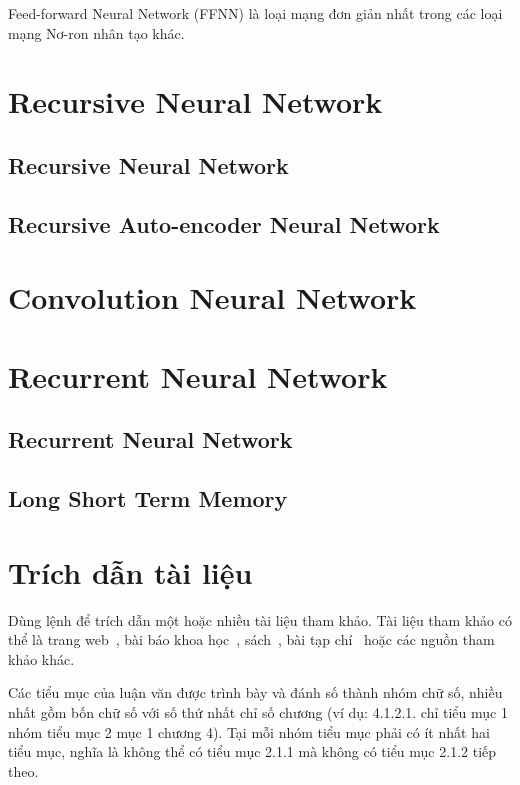 Feed-forward Neural Network (FFNN) là loại mạng đơn giản nhất trong các loại mạng Nơ-ron nhân tạo khác.  

\section{Recursive Neural Network}
\subsection{Recursive Neural Network}

\subsection{Recursive Auto-encoder Neural Network}


\section{Convolution Neural Network}


\section{Recurrent Neural Network}
\subsection{Recurrent Neural Network}
\subsection{Long Short Term Memory}




\section{Trích dẫn tài liệu}

Dùng lệnh  để trích dẫn một hoặc nhiều tài liệu tham khảo. Tài liệu tham khảo có thể là trang web~\cite{Listings,HDLVThS}, bài báo khoa học~\cite{1994-Cavnar}, sách~\cite{1984-TeX-Knuth,2006-DDien,2006-NPTV}, bài tạp chí~\cite{1989-TED} hoặc các nguồn tham khảo khác. 

Các tiểu mục của luận văn được trình bày và đánh số thành nhóm chữ số, nhiều nhất gồm bốn chữ số với số thứ nhất chỉ số chương (ví dụ: 4.1.2.1. chỉ tiểu mục 1 nhóm tiểu mục 2 mục 1 chương 4).
Tại mỗi nhóm tiểu mục phải có ít nhất hai tiểu mục, nghĩa là không thể có tiểu mục 2.1.1 mà không có tiểu mục 2.1.2 tiếp theo.

